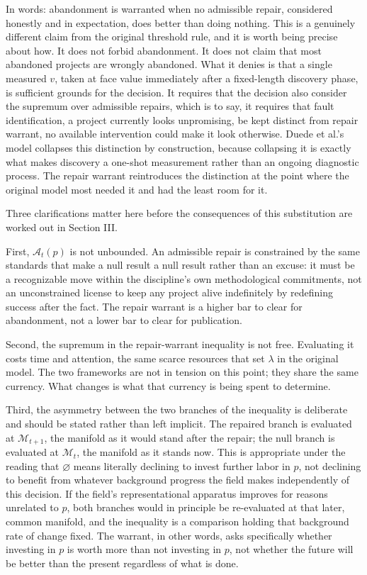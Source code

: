 \documentclass[11pt]{article}
\begin{document}
In words: abandonment is warranted when no admissible repair, considered honestly and in expectation, does better than doing nothing. This is a genuinely different claim from the original threshold rule, and it is worth being precise about how. It does not forbid abandonment. It does not claim that most abandoned projects are wrongly abandoned. What it denies is that a single measured $v$, taken at face value immediately after a fixed-length discovery phase, is sufficient grounds for the decision. It requires that the decision also consider the supremum over admissible repairs, which is to say, it requires that fault identification, a project currently looks unpromising, be kept distinct from repair warrant, no available intervention could make it look otherwise. Duede et al.'s model collapses this distinction by construction, because collapsing it is exactly what makes discovery a one-shot measurement rather than an ongoing diagnostic process. The repair warrant reintroduces the distinction at the point where the original model most needed it and had the least room for it.

Three clarifications matter here before the consequences of this substitution are worked out in Section III.

First, $\mathcal{A}_t(p)$ is not unbounded. An admissible repair is constrained by the same standards that make a null result a null result rather than an excuse: it must be a recognizable move within the discipline's own methodological commitments, not an unconstrained license to keep any project alive indefinitely by redefining success after the fact. The repair warrant is a higher bar to clear for abandonment, not a lower bar to clear for publication.

Second, the supremum in the repair-warrant inequality is not free. Evaluating it costs time and attention, the same scarce resources that set $\lambda$ in the original model. The two frameworks are not in tension on this point; they share the same currency. What changes is what that currency is being spent to determine.

Third, the asymmetry between the two branches of the inequality is deliberate and should be stated rather than left implicit. The repaired branch is evaluated at $\mathcal{M}_{t+1}$, the manifold as it would stand after the repair; the null branch is evaluated at $\mathcal{M}_t$, the manifold as it stands now. This is appropriate under the reading that $\varnothing$ means literally declining to invest further labor in $p$, not declining to benefit from whatever background progress the field makes independently of this decision. If the field's representational apparatus improves for reasons unrelated to $p$, both branches would in principle be re-evaluated at that later, common manifold, and the inequality is a comparison holding that background rate of change fixed. The warrant, in other words, asks specifically whether investing in $p$ is worth more than not investing in $p$, not whether the future will be better than the present regardless of what is done.
\end{document}
